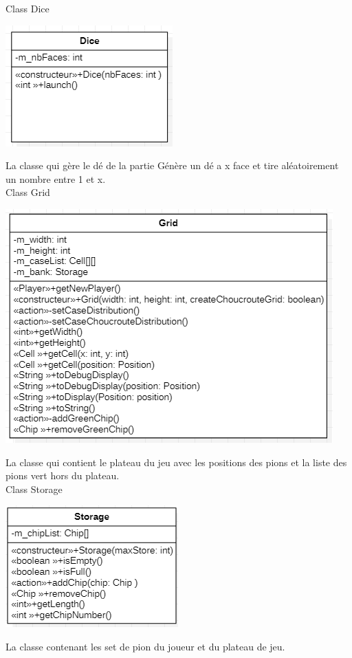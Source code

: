 Class Dice
\begin{center}
\includegraphics{Dice.png}
\end{center}
La classe qui gère le dé de la partie
Génère un dé a x face et tire aléatoirement un nombre entre 1 et x.\\

Class Grid
\begin{center}
\includegraphics{Grid.png}
\end{center}
La classe qui contient le plateau du jeu avec les positions des pions et la liste des pions vert hors du plateau. \\

Class Storage
\begin{center}
\includegraphics{Storage.png}
\end{center}
La classe contenant les set de pion du joueur et du plateau de jeu.